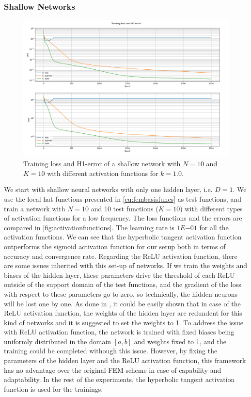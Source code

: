 \subsubsection{Shallow Networks}

\begin{figure}[h!]
    \centering
    \includegraphics[width=.7\textwidth]{img/VPINN-Comparison-Activation.png}
    \caption{Training loss and H1-error of a shallow network with $N=10$ and $K=10$ with different activation functions for $k=1.0$.}
    \label{fig:activationfunctions}
\end{figure}

We start with shallow neural networks with only one hidden layer, i.e. $D=1$. We use the local hat functions presented in \autoref{eq:fembasisfuncs} as test functions, and train a network with $N=10$ and 10 test functions ($K=10$) with different types of activation functions for a low frequency. The loss functions and the errors are compared in \autoref{fig:activationfunctions}. The learning rate is $1E{-01}$ for all the activation functions. We can see that the hyperbolic tangent activation function outperforms the sigmoid activation function for our setup both in terms of accuracy and convergence rate. Regarding the ReLU activation function, there are some issues inherited with this set-up of networks. If we train the weights and biases of the hidden layer, these parameters drive the threshold of each ReLU outside of the support domain of the test functions, and the gradient of the loss with respect to these parameters go to zero, so technically, the hidden neurons will be lost one by one. As done in \cite{liu2021}, it could be easily shown that in case of the ReLU activation function, the weights of the hidden layer are redundent for this kind of networks and it is suggested to set the weights to 1. To address the issue with ReLU activation function, the network is trained with fixed biases being uniformly distributed in the domain $[a, b]$ and weights fixed to 1, and the training could be completed withough this issue. However, by fixing the parameters of the hidden layer and the ReLU activation function, this framework has no advantage over the original FEM scheme in case of capability and adaptability. In the rest of the experiments, the hyperbolic tangent activation function is used for the trainings.

